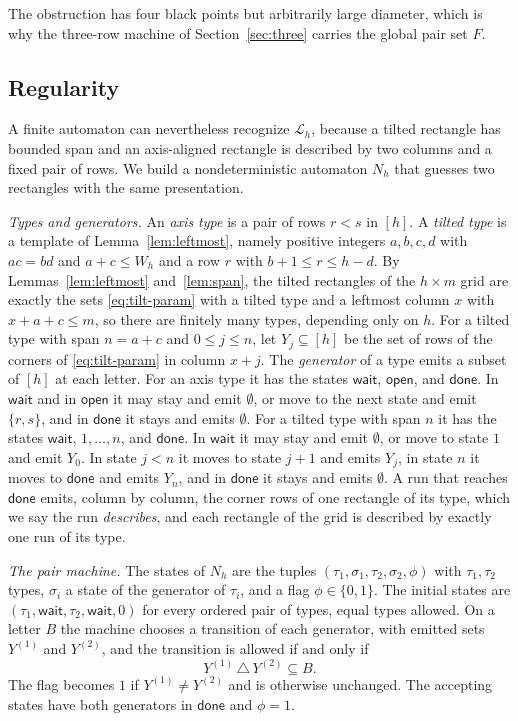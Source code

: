 The obstruction has four black points but arbitrarily large diameter, which is why the three-row machine of Section~\ref{sec:three} carries the global pair set $F$.

\subsection{Regularity}

A finite automaton can nevertheless recognize $\mathcal L_h$, because a tilted rectangle has bounded span and an axis-aligned rectangle is described by two columns and a fixed pair of rows. We build a nondeterministic automaton $N_h$ that guesses two rectangles with the same presentation.

\emph{Types and generators.} An \emph{axis type} is a pair of rows $r<s$ in $[h]$. A \emph{tilted type} is a template of Lemma~\ref{lem:leftmost}, namely positive integers $a,b,c,d$ with $ac=bd$ and $a+c\le W_h$ and a row $r$ with $b+1\le r\le h-d$. By Lemmas~\ref{lem:leftmost} and~\ref{lem:span}, the tilted rectangles of the $h\times m$ grid are exactly the sets \eqref{eq:tilt-param} with a tilted type and a leftmost column $x$ with $x+a+c\le m$, so there are finitely many types, depending only on $h$. For a tilted type with span $n=a+c$ and $0\le j\le n$, let $Y_j\subseteq[h]$ be the set of rows of the corners of \eqref{eq:tilt-param} in column $x+j$. The \emph{generator} of a type emits a subset of $[h]$ at each letter. For an axis type it has the states $\mathsf{wait}$, $\mathsf{open}$, and $\mathsf{done}$. In $\mathsf{wait}$ and in $\mathsf{open}$ it may stay and emit $\emptyset$, or move to the next state and emit $\{r,s\}$, and in $\mathsf{done}$ it stays and emits $\emptyset$. For a tilted type with span $n$ it has the states $\mathsf{wait}$, $1,\dots,n$, and $\mathsf{done}$. In $\mathsf{wait}$ it may stay and emit $\emptyset$, or move to state $1$ and emit $Y_0$. In state $j<n$ it moves to state $j+1$ and emits $Y_j$, in state $n$ it moves to $\mathsf{done}$ and emits $Y_n$, and in $\mathsf{done}$ it stays and emits $\emptyset$. A run that reaches $\mathsf{done}$ emits, column by column, the corner rows of one rectangle of its type, which we say the run \emph{describes}, and each rectangle of the grid is described by exactly one run of its type.

\emph{The pair machine.} The states of $N_h$ are the tuples $(\tau_1,\sigma_1,\tau_2,\sigma_2,\phi)$ with $\tau_1,\tau_2$ types, $\sigma_i$ a state of the generator of $\tau_i$, and a flag $\phi\in\{0,1\}$. The initial states are $(\tau_1,\mathsf{wait},\tau_2,\mathsf{wait},0)$ for every ordered pair of types, equal types allowed. On a letter $B$ the machine chooses a transition of each generator, with emitted sets $Y^{(1)}$ and $Y^{(2)}$, and the transition is allowed if and only if
\begin{equation}\label{eq:pairstep}
Y^{(1)}\,\triangle\,Y^{(2)}\subseteq B .
\end{equation}
The flag becomes $1$ if $Y^{(1)}\ne Y^{(2)}$ and is otherwise unchanged. The accepting states have both generators in $\mathsf{done}$ and $\phi=1$.

